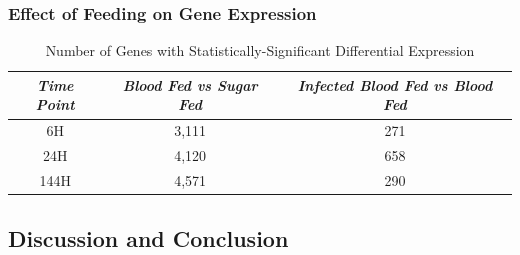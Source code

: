 \subsubsection{Effect of Feeding on Gene Expression}

\begin{table}[H]
  \centering
  \begin{tabular}{c c c} \hline
  \emph{Time Point} & \emph{Blood Fed vs Sugar Fed} & \emph{Infected Blood Fed vs Blood Fed} \\ \hline
  6H & 3,111 & 271 \\ \hline
  24H & 4,120 & 658 \\ \hline
  144H & 4,571 & 290 \\ \hline
  \end{tabular}
  \caption{Number of Genes with Statistically-Significant Differential Expression}
  \label{tab:stat-sig-genes}
\end{table}


\subsection{Discussion and Conclusion}